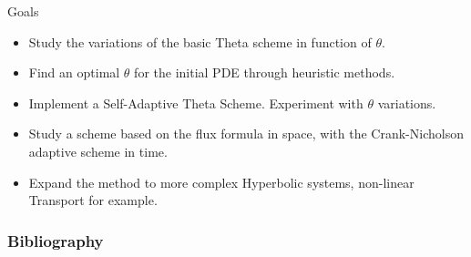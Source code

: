 \documentclass[10pt]{beamer}
\begin{document}
\begin{frame}{Goals}
        \begin{itemize}
            \item Study the variations of the basic Theta scheme in function of $\theta$.
            \item Find an optimal $\theta$ for the initial PDE through heuristic methods.
            \item Implement a Self-Adaptive Theta Scheme. Experiment with $\theta$ variations.
            \item Study a scheme based on the flux formula in space, with the Crank-Nicholson adaptive scheme in time.
            \item Expand the method to more complex Hyperbolic systems, non-linear Transport for example.
        \end{itemize}
\end{frame}

\begin{frame}
\frametitle{Bibliography}
\nocite{*}
\printbibliography
\end{frame}
\end{document}
